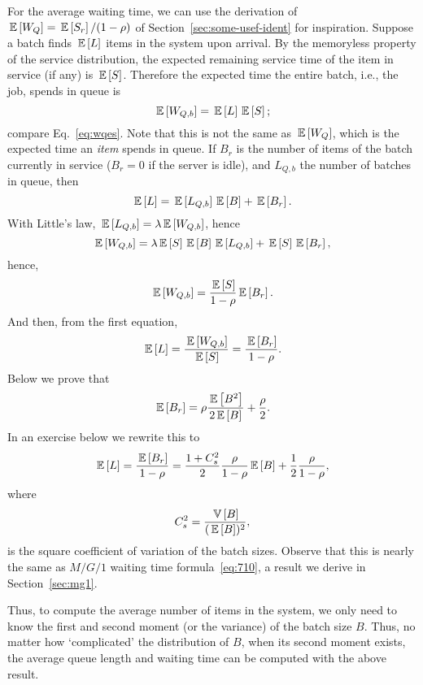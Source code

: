 For the average waiting time, we can use the derivation of
$\,\mathbb{E}\left[W_Q\right]=\,\mathbb{E}\left[S_r\right]/(1-\rho)$ of Section~\ref{sec:some-usef-ident} for
inspiration. Suppose a batch finds $\,\mathbb{E}\left[L\right]$ items in the system upon
arrival. By the memoryless property of the service distribution, the
expected remaining service time of the item in service (if any) is
$\,\mathbb{E}\left[S\right]$. Therefore the expected time the entire batch, i.e., the job,
spends in queue is
\begin{equation*}
  \,\mathbb{E}\left[W_{Q,b}\right] = \,\mathbb{E}\left[L\right] \,\mathbb{E}\left[S\right];
\end{equation*}
compare Eq.~\ref{eq:wqes}. Note that this is not the same as
$\,\mathbb{E}\left[W_Q\right]$, which is the expected time an \emph{item} spends in queue.
If $B_r$ is the number of items of the batch currently in service
($B_r=0$ if the server is idle), and $L_{Q,b}$ the number of batches
in queue, then
\begin{equation*}
  \,\mathbb{E}\left[L\right] = \,\mathbb{E}\left[L_{Q,b}\right]\,\mathbb{E}\left[B\right] + \,\mathbb{E}\left[B_r\right].
\end{equation*}
With  Little's law, $\,\mathbb{E}\left[L_{Q,b}\right] = \lambda \,\mathbb{E}\left[W_{Q,b}\right]$, hence
\begin{equation*}
  \,\mathbb{E}\left[W_{Q,b}\right] = \lambda \,\mathbb{E}\left[S\right] \,\mathbb{E}\left[B\right] \,\mathbb{E}\left[L_{Q,b}\right] + \,\mathbb{E}\left[S\right] \,\mathbb{E}\left[B_r\right],
\end{equation*}
hence,
\begin{equation*}
  \,\mathbb{E}\left[W_{Q,b}\right] = \frac{\,\mathbb{E}\left[S\right]}{1-\rho}\,\mathbb{E}\left[B_r\right].
\end{equation*}
And then, from the first equation, 
\begin{equation*}
  \,\mathbb{E}\left[L\right] = \frac{\,\mathbb{E}\left[W_{Q,b}\right]}{\,\mathbb{E}\left[S\right]} = \frac{\,\mathbb{E}\left[B_r\right]}{1-\rho}.
\end{equation*}
Below we prove that 
\begin{equation}\label{eq:br}
  \,\mathbb{E}\left[B_r\right] = \rho\frac{\,\mathbb{E}\left[B^2\right]}{2\,\mathbb{E}\left[B\right]} + \frac\rho2.
\end{equation}
In an exercise below we rewrite this to
\begin{equation}\label{eq:43}
\,\mathbb{E}\left[L\right]  = \frac{\,\mathbb{E}\left[B_r\right]}{1-\rho} = \frac{1+C_s^2}2 \frac{\rho}{1-\rho} \,\mathbb{E}\left[B\right] + \frac12\frac\rho{1-\rho},
\end{equation}
where
\begin{equation*}
C_s^2 = \frac{\,\mathbb{V}\left[B\right]}{(\,\mathbb{E}\left[B\right])^2},
\end{equation*}
is the square coefficient of variation of the batch sizes.  Observe
that this is nearly the same as $M/G/1$ waiting time
formula~\ref{eq:710}, a result we derive in Section~\ref{sec:mg1}. 

Thus, to compute the average number of items in the system, we only
need to know the first and second moment (or the variance) of the
batch size $B$. Thus, no matter how `complicated' the distribution of
$B$, when its second moment exists, the average queue length and
waiting time can be computed with the above result. 



